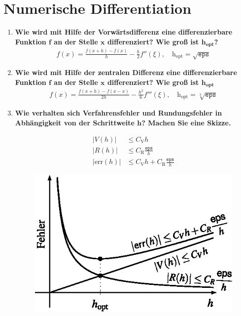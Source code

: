 \section{Numerische Differentiation}
	\begin{enumerate}
		\item \textbf{Wie wird mit Hilfe der Vorwärtsdifferenz eine differenzierbare Funktion $\mathbf{f}$ an der Stelle $\mathbf{x}$ differenziert? Wie groß ist $\mathbf{\text{h}_{\text{opt}}}$?}
			\begin{align*}
				f(x)=\frac{f(x+h)-f(x)}{h}-\frac{h}{2}f''(\xi), \quad \text{h}_{\text{opt}}=\sqrt{\texttt{eps}}
			\end{align*}
		\item \textbf{Wie wird mit Hilfe der zentralen Differenz eine differenzierbare Funktion $\mathbf{f}$ an der Stelle $\mathbf{x}$ differenziert? Wie groß ist $\mathbf{\text{h}_{\text{opt}}}$}
			\begin{align*}
				f(x)=\frac{f(x+h)-f(x-x)}{2h}-\frac{h^2}{6}f'''(\xi), \quad \text{h}_{\text{opt}}=\sqrt[3]{\texttt{eps}}
			\end{align*}
		\item \textbf{Wie verhalten sich Verfahrensfehler und Rundungsfehler in Abhängigkeit von der Schrittweite $\mathbf{h}$? Machen Sie eine Skizze.}
			\begin{figure}[!htbp]
				\centering				
				\begin{minipage}{.4\textwidth}
					\centering
					\begin{align*}
						|V(h)|&\leq C_\text{V} h \\
						|R(h)|&\leq C_\text{R} \frac{\texttt{eps}}{h} \\
						|\text{err}(h)|&\leq C_\text{V} h + C_\text{R} \frac{\texttt{eps}}{h}
					\end{align*}
				\end{minipage} %
				\begin{minipage}{.5\textwidth}
					\centering
					\includegraphics[width=0.8\linewidth]{Kap2_1}

\end{minipage}
\end{figure}
\end{enumerate}
